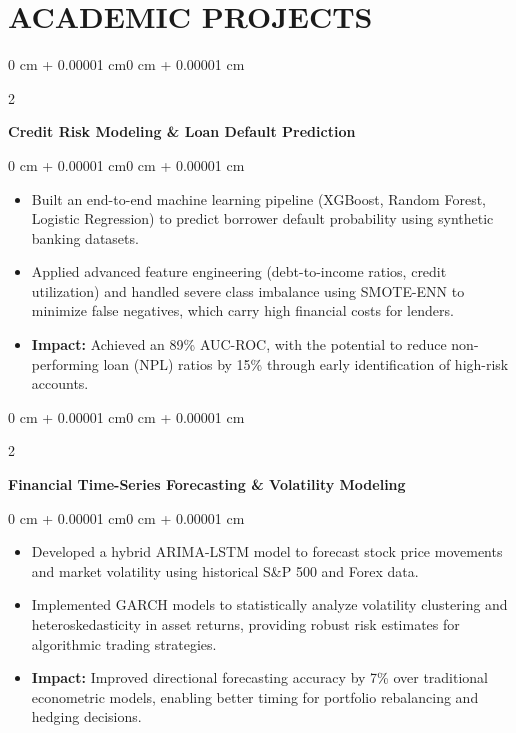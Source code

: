 \documentclass[9.5pt, letterpaper]{article}
\newenvironment{highlights}{
    \begin{itemize}[
        topsep=0pt,
        parsep=0pt,
        partopsep=0pt,
        itemsep=0pt,
        leftmargin=0 cm + 8pt
    ]
}{
    \end{itemize}
}
\newenvironment{onecolentry}{
    \begin{adjustwidth}{0 cm + 0.00001 cm}{0 cm + 0.00001 cm}
}{
    \end{adjustwidth}
}
\newenvironment{twocolentry}[2][]{
    \onecolentry
    \def\secondColumn{#2}
    \setcolumnwidth{\fill, 3.5 cm}
    \begin{paracol}{2}
}{
    \switchcolumn \raggedleft \secondColumn
    \end{paracol}
    \endonecolentry
}
\begin{document}
    \section{ACADEMIC PROJECTS}

    \begin{twocolentry}{2024}
        \textbf{Credit Risk Modeling \& Loan Default Prediction}
    \end{twocolentry}
    \vspace{0.01 cm}
    \begin{onecolentry}
        \begin{highlights}
            \item Built an end-to-end machine learning pipeline (XGBoost, Random Forest, Logistic Regression) to predict borrower default probability using synthetic banking datasets.
            \item Applied advanced feature engineering (debt-to-income ratios, credit utilization) and handled severe class imbalance using SMOTE-ENN to minimize false negatives, which carry high financial costs for lenders.
            \item \textbf{Impact:} Achieved an 89\% AUC-ROC, with the potential to reduce non-performing loan (NPL) ratios by 15\% through early identification of high-risk accounts.
        \end{highlights}
    \end{onecolentry}

    \vspace{0.01 cm}

    \begin{twocolentry}{2024}
        \textbf{Financial Time-Series Forecasting \& Volatility Modeling}
    \end{twocolentry}
    \vspace{0.01 cm}
    \begin{onecolentry}
        \begin{highlights}
            \item Developed a hybrid ARIMA-LSTM model to forecast stock price movements and market volatility using historical S\&P 500 and Forex data.
            \item Implemented GARCH models to statistically analyze volatility clustering and heteroskedasticity in asset returns, providing robust risk estimates for algorithmic trading strategies.
            \item \textbf{Impact:} Improved directional forecasting accuracy by 7\% over traditional econometric models, enabling better timing for portfolio rebalancing and hedging decisions.
        \end{highlights}
    \end{onecolentry}
\end{document}

